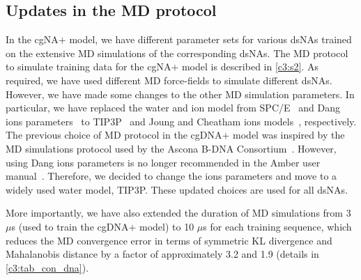 \subsection{Updates in the MD protocol}
In the cgNA$+$ model, we have different parameter sets for various dsNAs trained on the extensive MD simulations of the corresponding dsNAs. 
The MD protocol to simulate training data for the cgNA$+$ model is described in \cref{c3:s2}.
As required, we have used different MD force-fields to simulate different dsNAs.
However, we have made some changes to the other MD simulation parameters. 
In particular, we have replaced the water and ion model from SPC/E~\cite{spce} and Dang ions parameters~\cite{dang1995mechanism} to TIP3P~\cite{tip3p} and Joung and Cheatham ions models~\cite{jcion}, respectively.
The previous choice of MD protocol in the cgDNA$+$ model was inspired by the MD simulations protocol used by the Ascona B-DNA Consortium~\cite{pasi2014muabc}.
However, using Dang ions parameters is no longer recommended in the Amber user manual~\cite{ambermanual}.
Therefore, we decided to change the ions parameters and move to a widely used water model, TIP3P. 
These updated choices are used for all dsNAs. 

More importantly, we have also extended the duration of MD simulations from 3 $\mu$s (used to train the cgDNA$+$ model) to 10 $\mu$s for each training sequence, which reduces the MD convergence error in terms of symmetric KL divergence and Mahalanobis distance by a factor of approximately 3.2 and 1.9 (details in \cref{c3:tab_con_dna}).

